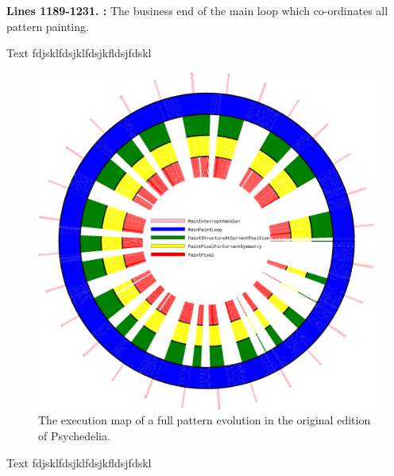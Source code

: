 \bigskip
\bigskip
\bigskip
\bigskip
\bigskip
\textbf{Lines 1189-1231. :} The business end of the main loop which co-ordinates all pattern
painting.


\clearpage
Text fdjsklfdsjklfdsjkfldsjfdskl
\vfill
\begin{figure}[H]                                                          
  \centering                                                             
  \begin{adjustbox}{width=13cm,center}                                   
  \includegraphics[width=13cm]{src/listing_commentary/execution_cycle.png}%
  \end{adjustbox}                                                        
\caption{The execution map of a full pattern evolution in the original edition of Psychedelia.}                                           
\end{figure}                                                               
\vfill
\clearpage
Text fdjsklfdsjklfdsjkfldsjfdskl
\vfill
